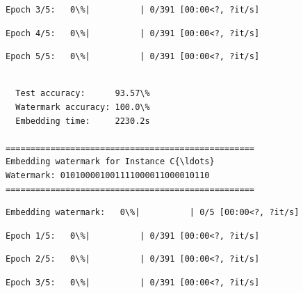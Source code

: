 \documentclass[11pt]{article}
\begin{document}
    
    
    \begin{Verbatim}[commandchars=\\\{\}]
Epoch 3/5:   0\%|          | 0/391 [00:00<?, ?it/s]
    \end{Verbatim}

    
    
    \begin{Verbatim}[commandchars=\\\{\}]
Epoch 4/5:   0\%|          | 0/391 [00:00<?, ?it/s]
    \end{Verbatim}

    
    
    \begin{Verbatim}[commandchars=\\\{\}]
Epoch 5/5:   0\%|          | 0/391 [00:00<?, ?it/s]
    \end{Verbatim}

    
    \begin{Verbatim}[commandchars=\\\{\}]

  Test accuracy:      93.57\%
  Watermark accuracy: 100.0\%
  Embedding time:     2230.2s

==================================================
Embedding watermark for Instance C{\ldots}
Watermark: 010100001001111000011000010110
==================================================
    \end{Verbatim}

    
    \begin{Verbatim}[commandchars=\\\{\}]
Embedding watermark:   0\%|          | 0/5 [00:00<?, ?it/s]
    \end{Verbatim}

    
    
    \begin{Verbatim}[commandchars=\\\{\}]
Epoch 1/5:   0\%|          | 0/391 [00:00<?, ?it/s]
    \end{Verbatim}

    
    
    \begin{Verbatim}[commandchars=\\\{\}]
Epoch 2/5:   0\%|          | 0/391 [00:00<?, ?it/s]
    \end{Verbatim}

    
    
    \begin{Verbatim}[commandchars=\\\{\}]
Epoch 3/5:   0\%|          | 0/391 [00:00<?, ?it/s]
    \end{Verbatim}
\end{document}
